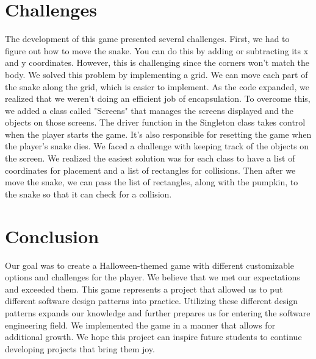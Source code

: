 \documentclass[sigplan,screen]{acmart}
\begin{document}
\section{Challenges}
The development of this game presented several challenges. First, we had to figure out how to move the snake. You can do this by adding or subtracting its x and y coordinates. However, this is challenging since the corners won't match the body. We solved this problem by implementing a grid. We can move each part of the snake along the grid, which is easier to implement. As the code expanded, we realized that we weren't doing an efficient job of encapsulation. To overcome this, we added a class called "Screens" that manages the screens displayed and the objects on those screens. The driver function in the Singleton class takes control when the player starts the game. It's also responsible for resetting the game when the player's snake dies. We faced a challenge with keeping track of the objects on the screen. We realized the easiest solution was for each class to have a list of coordinates for placement and a list of rectangles for collisions. Then after we move the snake, we can pass the list of rectangles, along with the pumpkin, to the snake so that it can check for a collision. 

\section{Conclusion}
Our goal was to create a Halloween-themed game with different customizable options and challenges for the player. We believe that we met our expectations and exceeded them. This game represents a project that allowed us to put different software design patterns into practice. Utilizing these different design patterns expands our knowledge and further prepares us for entering the software engineering field. We implemented the game in a manner that allows for additional growth. We hope this project can inspire future students to continue developing projects that bring them joy.\cite{code} 



\end{document}
